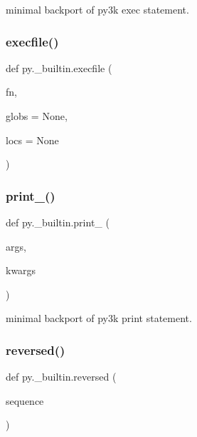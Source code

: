 \begin{DoxyVerb}minimal backport of py3k exec statement. \end{DoxyVerb}
 \mbox{\label{namespacepy_1_1__builtin_af40328c21a713c0533167b79290aab16}} 
\subsubsection{\texorpdfstring{execfile()}{execfile()}}
{\footnotesize\ttfamily def py.\+\_\+builtin.\+execfile (\begin{DoxyParamCaption}\item[{}]{fn,  }\item[{}]{globs = {\ttfamily None},  }\item[{}]{locs = {\ttfamily None} }\end{DoxyParamCaption})}

\mbox{\label{namespacepy_1_1__builtin_aecf984c0e0aad62105cd32877fdd26c1}} 
\subsubsection{\texorpdfstring{print\+\_\+()}{print\_()}}
{\footnotesize\ttfamily def py.\+\_\+builtin.\+print\+\_\+ (\begin{DoxyParamCaption}\item[{}]{args,  }\item[{}]{kwargs }\end{DoxyParamCaption})}

\begin{DoxyVerb}minimal backport of py3k print statement. \end{DoxyVerb}
 \mbox{\label{namespacepy_1_1__builtin_af8bc219fdf4a207651ea11ffcb0e33c6}} 
\subsubsection{\texorpdfstring{reversed()}{reversed()}}
{\footnotesize\ttfamily def py.\+\_\+builtin.\+reversed (\begin{DoxyParamCaption}\item[{}]{sequence }\end{DoxyParamCaption})}

